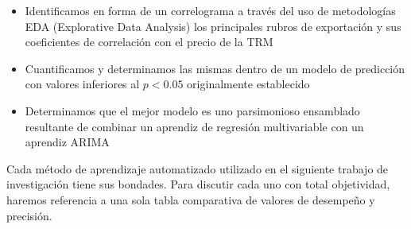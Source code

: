 \begin{itemize}
    \item Identificamos en forma de un correlograma a través del uso de metodologías EDA (Explorative Data Analysis) los principales rubros de exportación y sus coeficientes de correlación con el precio de la TRM
    \item Cuantificamos y determinamos las mismas dentro de un modelo de predicción con valores inferiores al $p < 0.05$ originalmente establecido
    \item Determinamos que el mejor modelo es uno parsimonioso ensamblado resultante de combinar un aprendiz de regresión multivariable con un aprendiz ARIMA
\end{itemize}

Cada método de aprendizaje automatizado utilizado en el siguiente trabajo de investigación tiene sus bondades. Para discutir cada uno con total objetividad, haremos referencia a una sola tabla comparativa de valores de desempeño y precisión.

